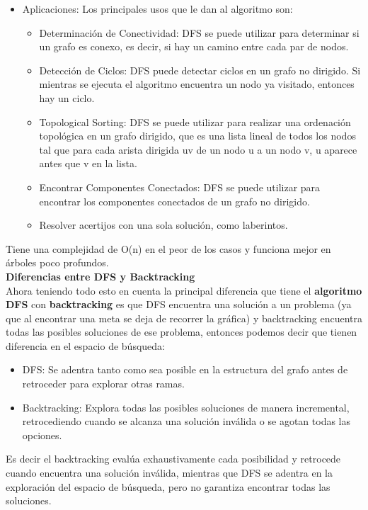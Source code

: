 \begin{itemize}
    \item Aplicaciones: Los principales usos que le dan al algoritmo son:
    \begin{itemize}
        \item Determinación de Conectividad: DFS se puede utilizar para determinar si un grafo es conexo, es decir, si hay un camino entre cada par de nodos.

        \item Detección de Ciclos: DFS puede detectar ciclos en un grafo no dirigido. Si mientras se ejecuta el algoritmo encuentra un nodo ya visitado, entonces hay un ciclo.

        \item Topological Sorting: DFS se puede utilizar para realizar una ordenación topológica en un grafo dirigido, que es una lista lineal de todos los nodos tal que para cada arista dirigida uv de un nodo u a un nodo v, u aparece antes que v en la lista.

        \item Encontrar Componentes Conectados: DFS se puede utilizar para encontrar los componentes conectados de un grafo no dirigido.

        \item Resolver acertijos con una sola solución, como laberintos.
    \end{itemize}

    \end{itemize}

Tiene una complejidad de O(n) en el peor de los casos y funciona mejor en árboles poco profundos.\\


    \textbf{\large{Diferencias entre DFS y Backtracking}} \\


    Ahora teniendo todo esto en cuenta la principal diferencia que tiene el \textbf{algoritmo DFS} con \textbf{backtracking} es que DFS encuentra una solución a un problema (ya que al encontrar una meta se deja de recorrer la gráfica) y backtracking encuentra todas las posibles soluciones de ese problema, entonces podemos decir que tienen diferencia en el espacio de búsqueda:\\

    \begin{itemize}
        \item DFS: Se adentra tanto como sea posible en la estructura del grafo antes de retroceder para explorar otras ramas.

        \item Backtracking: Explora todas las posibles soluciones de manera incremental, retrocediendo cuando se alcanza una solución inválida o se agotan todas las opciones.
    \end{itemize}

    Es decir el backtracking evalúa exhaustivamente cada posibilidad y retrocede cuando encuentra una solución inválida, mientras que DFS se adentra en la exploración del espacio de búsqueda, pero no garantiza encontrar todas las soluciones.

